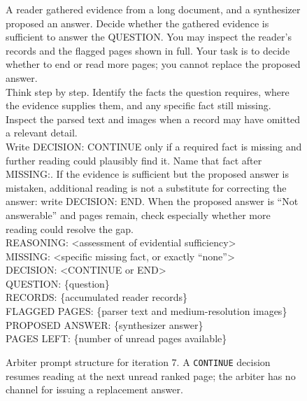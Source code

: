 \begin{figure}[h]
\centering
\begin{tcolorbox}[
  colback=gray!5,colframe=gray!50,boxrule=0.4pt,
  fontupper=\small\ttfamily,left=6pt,right=6pt
]
A reader gathered evidence from a long document, and a synthesizer
proposed an answer. Decide whether the gathered evidence is sufficient
to answer the QUESTION. You may inspect the reader's records and the
flagged pages shown in full. Your task is to decide whether to end or
read more pages; you cannot replace the proposed answer.\\[0.5em]

Think step by step. Identify the facts the question requires, where
the evidence supplies them, and any specific fact still missing.
Inspect the parsed text and images when a record may have omitted a
relevant detail.\\[0.5em]

Write DECISION: CONTINUE only if a required fact is missing and further
reading could plausibly find it. Name that fact after MISSING:. If the
evidence is sufficient but the proposed answer is mistaken, additional
reading is not a substitute for correcting the answer: write
DECISION: END. When the proposed answer is ``Not answerable'' and pages
remain, check especially whether more reading could resolve the gap.\\[0.5em]

REASONING: <assessment of evidential sufficiency>\\
MISSING: <specific missing fact, or exactly ``none''>\\
DECISION: <CONTINUE or END>\\[0.5em]

QUESTION: \{question\}\\
RECORDS: \{accumulated reader records\}\\
FLAGGED PAGES: \{parser text and medium-resolution images\}\\
PROPOSED ANSWER: \{synthesizer answer\}\\
PAGES LEFT: \{number of unread pages available\}
\end{tcolorbox}
\caption{Arbiter prompt structure for iteration 7. A \texttt{CONTINUE} decision resumes reading at the next unread ranked page; the arbiter has no channel for issuing a replacement answer.}
\label{fig:app_arbiter_prompt}
\end{figure}
